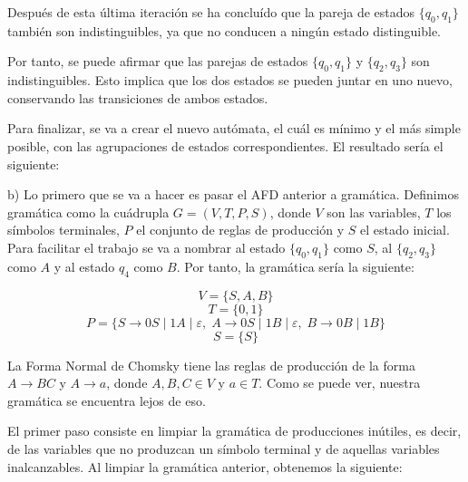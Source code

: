 \documentclass[11pt,a4paper]{article}
\begin{document}
		Después de esta última iteración se ha concluído que la pareja de estados $\{q_0, q_1\}$ también son indistinguibles,
		ya que no conducen a ningún estado distinguible. \par
		
		Por tanto, se puede afirmar que las parejas de estados $\{q_0, q_1\}$ y $\{q_2, q_3\}$ son indistinguibles. Esto
		implica que los dos estados se pueden juntar en uno nuevo, conservando las transiciones de ambos estados. \par
		
		Para finalizar, se va a crear el nuevo autómata, el cuál es mínimo y el más simple posible, con las agrupaciones
		de estados correspondientes. El resultado sería el siguiente:
		
		\begin{figure}[H]
			\centering
		\end{figure}
		
		b) Lo primero que se va a hacer es pasar el AFD anterior a gramática. Definimos gramática como la cuádrupla $G = (V,
		T, P, S)$, donde $V$ son las variables, $T$ los símbolos terminales, $P$ el conjunto de reglas de producción y $S$
		el estado inicial. Para facilitar el trabajo se va a nombrar al estado $\{q_0, q_1\}$ como $S$, al $\{q_2, q_3\}$
		como $A$ y al estado $q_4$ como $B$. Por tanto, la gramática sería la siguiente:
		
		\[V = \{S, A, B\}\]
		\[T = \{0, 1\}\]
		\[P = \{S \rightarrow 0S \; | \; 1A \; | \; \varepsilon, \; A \rightarrow 0S \; | \; 1B \; | \; \varepsilon, \;
				B \rightarrow 0B \; | \; 1B\} \]
		\[S = \{ S \} \]
		
		La Forma Normal de Chomsky tiene las reglas de producción de la forma $A \rightarrow BC$ y $A \rightarrow a$, donde
		$A, B, C \in V$ y $a \in T$. Como se puede ver, nuestra gramática se encuentra lejos de eso. \par
		
		El primer paso consiste en limpiar la gramática de producciones inútiles, es decir, de las variables que no produzcan
		un símbolo terminal y de aquellas variables inalcanzables. Al limpiar la gramática anterior, obtenemos la siguiente:
		
\end{document}
